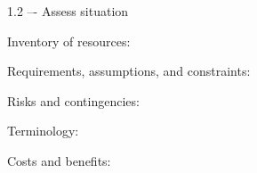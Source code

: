 \documentclass{article}
\begin{document}
1.2 –- Assess situation

Inventory of resources:

Requirements, assumptions, and constraints:

Risks and contingencies:

Terminology:

Costs and benefits:



\end{document}
